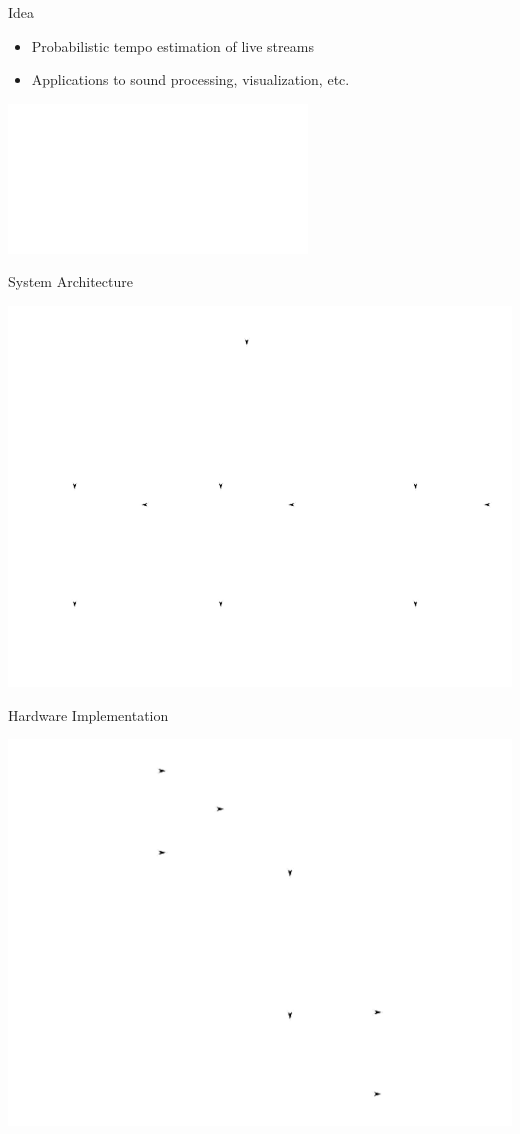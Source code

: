 \documentclass[10pt]{beamer}
\title{\projname}
\subtitle{A Hardware Beat Tracker}
\author{Joseph Colosimo}
\date{March 20, 2013}
\institute{Massachusetts Institute of Technology}
\begin{document}
\begin{frame}
    \titlepage
\end{frame}

\begin{frame}{Idea}\begin{center}
    \begin{itemize}
        \item<1-> Probabilistic tempo estimation of live streams
        \item<3-> Applications to sound processing, visualization, etc.
    \end{itemize}

    \vspace{10pt}

    \includegraphics<2->{fig/target.pdf}

\end{center}\end{frame}

\begin{frame}{System Architecture}\begin{center}
    \includegraphics[scale=0.75]{fig/architecture.pdf}
\end{center}\end{frame}

\begin{frame}{Hardware Implementation}\begin{center}
    \includegraphics[scale=0.75]{fig/implementation.pdf}
\end{center}\end{frame}
\end{document}

